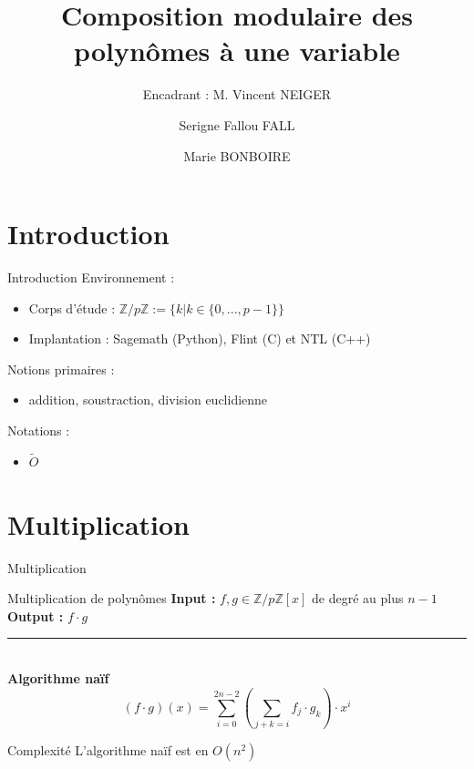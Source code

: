 \documentclass[10pt,a4paper]{beamer}
\institute{Sorbonne Université}
\title[Center text]{\textbf{Composition modulaire des polynômes à une variable}}
\subtitle{\small{Encadrant : M. Vincent NEIGER}}
\author{Serigne Fallou FALL \and Marie BONBOIRE}
\date{}
\begin{document}
\begin{frame}[plain]
    \titlepage
\end{frame}

\begin{frame}
    \tableofcontents
\end{frame}

\section{Introduction}
\begin{frame}{Introduction}
    Environnement :
    \begin{itemize}
        \item Corps d'étude : $\mathbb{Z}/p\mathbb{Z} := \{k | k\in\{0, ..., p-1\}\}$
        \item Implantation : Sagemath (Python), Flint (C) et NTL (C++)  
    \end{itemize}

    Notions primaires :
    \begin{itemize}
        \item addition, soustraction, division euclidienne
    \end{itemize}

    Notations  :
    \begin{itemize}
        \item $\tilde{O}$
    \end{itemize}
\end{frame}

\section{Multiplication}
\begin{frame}{Multiplication}
    \begin{block}{Multiplication de polynômes}
        \textbf{Input :} $f,g \in \mathbb{Z}/p\mathbb{Z}[x]$ de degré au plus $n-1$ \\
        \textbf{Output :} $f \cdot g$
    \end{block}
    \rule{\linewidth}{0.2mm}\\[0.5cm]
    \textbf{Algorithme naïf}
    \[
    (f \cdot g)(x)=\sum_{i=0}^{2n-2} (\sum_{j+k=i}f_j \cdot g_k) \cdot x^i
    \]

    \begin{alertblock}{Complexité}
        L'algorithme naïf est en $O(n^2)$
    \end{alertblock}

\end{frame}
\end{document}
